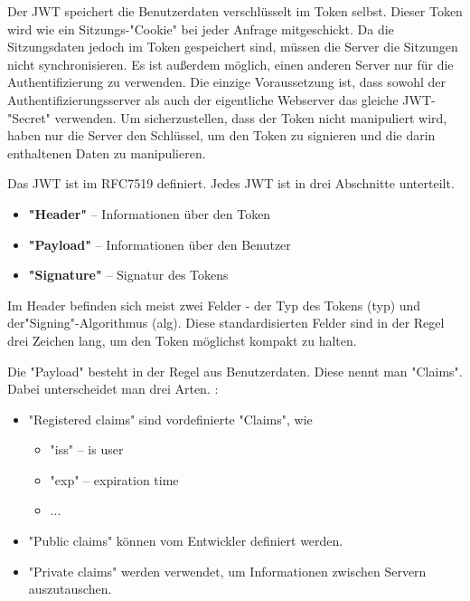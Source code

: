 \label{sec:jwt}

Der JWT speichert die Benutzerdaten verschlüsselt im Token selbst. Dieser Token wird wie ein Sitzungs-"Cookie" bei jeder Anfrage mitgeschickt. 
Da die Sitzungsdaten jedoch im Token gespeichert sind, müssen die Server die Sitzungen nicht synchronisieren. 
Es ist außerdem möglich, einen anderen Server nur für die Authentifizierung zu verwenden. 
Die einzige Voraussetzung ist, dass sowohl der Authentifizierungsserver als auch der eigentliche Webserver das gleiche JWT-"Secret" verwenden. 
Um sicherzustellen, dass der Token nicht manipuliert wird, haben nur die Server den Schlüssel, um den Token zu signieren und die darin enthaltenen Daten zu manipulieren. \cite{Auth0JWT}

Das JWT ist im RFC7519 definiert. Jedes JWT ist in drei Abschnitte\cite{Auth0JWT} unterteilt. 

\begin{itemize}
    \item \textbf{"Header"} -- Informationen über den Token
    \item \textbf{"Payload"} -- Informationen über den Benutzer
    \item \textbf{"Signature"} -- Signatur des Tokens
\end{itemize}

Im Header befinden sich meist zwei Felder - der Typ des Tokens ({\ttfamily typ}) und der\linebreak"Signing"-Algorithmus ({\ttfamily alg}). 
Diese standardisierten Felder sind in der Regel drei Zeichen lang, um den Token möglichst kompakt zu halten. \cite{Auth0JWT}

Die "Payload" besteht in der Regel aus Benutzerdaten. Diese nennt man "Claims". Dabei unterscheidet man drei Arten. \cite{Auth0JWT}: 

\begin{itemize}
    \item "Registered claims" sind vordefinierte "Claims", wie
    \begin{itemize}
        \item "iss" -- is user
        \item "exp" --  expiration time
        \item ...
    \end{itemize}
    \item "Public claims" können vom Entwickler definiert werden.
    \item "Private claims" werden verwendet, um Informationen zwischen Servern aus\-zu\-tauschen.
\end{itemize}

